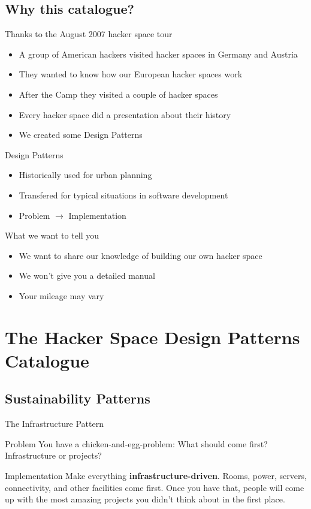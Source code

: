 \documentclass[mathserif]{beamer}
\newenvironment{itemizeframe}[1]
	{\begin{frame}{#1}\startitemizeframe}
	{\stopitemizeframe\end{frame}}
\newcommand\startitemizeframe{\begin{itemize}}
\newcommand\stopitemizeframe{\end{itemize}}
\begin{document}

\subsection{Why this catalogue?}

\begin{itemizeframe}{Thanks to the August 2007 hacker space tour}
	\item A group of American hackers visited hacker spaces in Germany and Austria
	\item They wanted to know how our European hacker spaces work
	\item After the Camp they visited a couple of hacker spaces
	\item Every hacker space did a presentation about their history
	\item We created some Design Patterns
\end{itemizeframe}

\begin{itemizeframe}{Design Patterns}
	\item Historically used for urban planning
	\item Transfered for typical situations in software development
	\item Problem $\rightarrow$ Implementation
\end{itemizeframe}

\begin{itemizeframe}{What we want to tell you}
	\item We want to share our knowledge of building our own hacker space
	\item We won't give you a detailed manual
	\item Your mileage may vary
\end{itemizeframe}


\section[Design Patterns]{The Hacker Space Design Patterns Catalogue}

\subsection{Sustainability Patterns}

\begin{frame}{The Infrastructure Pattern}
	\begin{alertblock}{Problem}
		You have a chicken-and-egg-problem: What should come first?  Infrastructure
		or projects?
	\end{alertblock}
	\pause
	\begin{exampleblock}{Implementation}
		Make everything \textbf{infrastructure-driven}.  Rooms, power, servers,
		connectivity, and other facilities come first.  Once you have that, people
		will come up with the most amazing projects you didn't think about in the
		first place.
	\end{exampleblock}
\end{frame}
\end{document}
